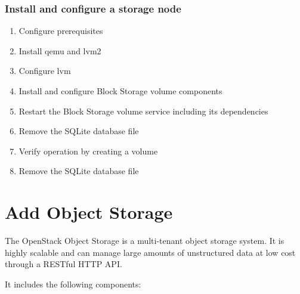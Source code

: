     \subsubsection{Install and configure a storage node}
        \begin{enumerate}
            \item Configure prerequisites
            \item Install qemu and lvm2
            \item Configure lvm
            \item Install and configure Block Storage volume components
            \item Restart the Block Storage volume service including its dependencies
            \item Remove the SQLite database file
            \item Verify operation by creating a volume
            \item Remove the SQLite database file
        \end{enumerate}   


\section{Add Object Storage}

    \par The OpenStack Object Storage is a multi-tenant object storage system. It is highly scalable and can manage large amounts of unstructured data at low cost through a RESTful HTTP API.

    \par It includes the following components:
    
